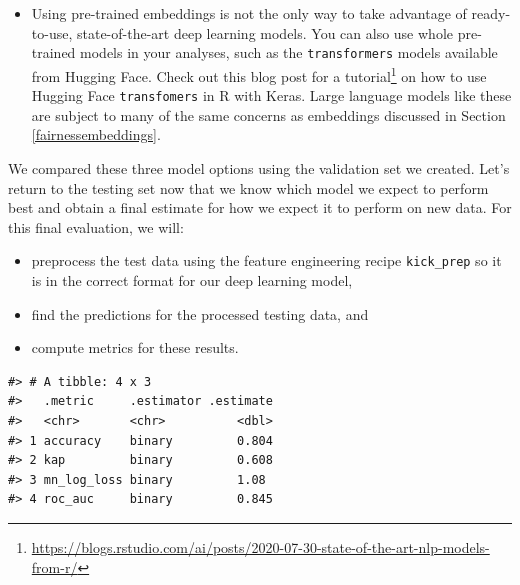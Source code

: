 \documentclass[
]{krantz}
\makeatletter
\newenvironment{Shaded}{\begin{snugshade}}{\end{snugshade}}
\newcommand{\AttributeTok}[1]{\textcolor[rgb]{0.77,0.63,0.00}{#1}}
\newcommand{\FunctionTok}[1]{\textcolor[rgb]{0.00,0.00,0.00}{#1}}
\newcommand{\NormalTok}[1]{#1}
\newcommand{\OtherTok}[1]{\textcolor[rgb]{0.56,0.35,0.01}{#1}}
\newcommand{\SpecialCharTok}[1]{\textcolor[rgb]{0.00,0.00,0.00}{#1}}
\newcommand{\StringTok}[1]{\textcolor[rgb]{0.31,0.60,0.02}{#1}}
\DeclareRobustCommand{\href}[2]{#2\footnote{\url{#1}}}
\renewcommand{\href}[2]{#2\footnote{\url{#1}}}
\newenvironment{kframe}{%
\medskip{}
\setlength{\fboxsep}{.8em}
 \def\at@end@of@kframe{}%
 \ifinner\ifhmode%
  \def\at@end@of@kframe{\end{minipage}}%
  \begin{minipage}{\columnwidth}%
 \fi\fi%
 \def\FrameCommand##1{\hskip\@totalleftmargin \hskip-\fboxsep
 \colorbox{shadecolor}{##1}\hskip-\fboxsep
     \hskip-\linewidth \hskip-\@totalleftmargin \hskip\columnwidth}%
 \MakeFramed {\advance\hsize-\width
   \@totalleftmargin\z@ \linewidth\hsize
   \@setminipage}}%
 {\par\unskip\endMakeFramed%
 \at@end@of@kframe}
\renewenvironment{Shaded}{\begin{kframe}}{\end{kframe}}
\newenvironment{rmdblock}[1]
  {\begin{shaded*}
  \begin{itemize}[left = -1cm, labelsep = 1cm]
  \renewcommand{\labelitemi}{
    \raisebox{-.7\height}[0pt][0pt]{
      {\setkeys{Gin}{width=3em,keepaspectratio}\texttt{[image: images/\#1]}}
    }
  }
 
  \item
  }
  {
  \end{itemize}
  \end{shaded*}
  }
\newenvironment{rmdnote}
  {\begin{rmdblock}{note}}
  {\end{rmdblock}}
\makeatother
\begin{document}
\begin{rmdnote}
Using pre-trained embeddings is not the only way to take advantage of ready-to-use, state-of-the-art deep learning models. You can also use whole pre-trained models in your analyses, such as the \texttt{transformers} models available from Hugging Face. Check out \href{https://blogs.rstudio.com/ai/posts/2020-07-30-state-of-the-art-nlp-models-from-r/}{this blog post for a tutorial} on how to use Hugging Face \texttt{transfomers} in R with Keras. Large language models like these are subject to many of the same concerns as embeddings discussed in Section \ref{fairnessembeddings}.
\end{rmdnote}

We compared these three model options using the validation set we created. Let's return to the testing set now that we know which model we expect to perform best and obtain a final estimate for how we expect it to perform on new data. For this final evaluation, we will:

\begin{itemize}
\item
  preprocess the test data using the feature engineering recipe \texttt{kick\_prep} so it is in the correct format for our deep learning model,
\item
  find the predictions for the processed testing data, and
\item
  compute metrics for these results.
\end{itemize}

\begin{Shaded}
\end{Shaded}

\begin{verbatim}
#> # A tibble: 4 x 3
#>   .metric     .estimator .estimate
#>   <chr>       <chr>          <dbl>
#> 1 accuracy    binary         0.804
#> 2 kap         binary         0.608
#> 3 mn_log_loss binary         1.08 
#> 4 roc_auc     binary         0.845
\end{verbatim}
\end{document}
